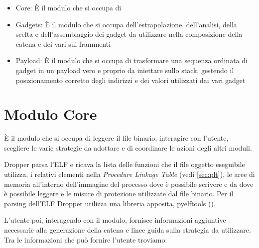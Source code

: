 \begin{itemize}

  \item Core: È il modulo che si occupa di 
  \item Gadgets: È il modulo che si occupa dell'estrapolazione,
    dell'analisi, della scelta e dell'assemblaggio dei gadget da utilizzare nella
    composizione della catena e dei vari sui frammenti

  \item Payload: È il modulo che si occupa di trasformare una
    sequenza ordinata di gadget in un payload vero e proprio da
    iniettare sullo stack, gestendo il posizionamento corretto degli
    indirizzi e dei valori utilizzati dai vari gadget

\end{itemize}

\section{Modulo Core}
\label{sec:arc:core}

È il modulo che si occupa di leggere il file binario, interagire con
l'utente, scegliere le varie strategie da adottare e di coordinare le
azioni degli altri moduli. 

Dropper parsa l'ELF e ricava la lista delle funzioni che il file
oggetto eseguibile utilizza, i relativi elementi nella \emph{Procedure
  Linkage Table} (vedi \ref{sec:plt}), le aree di memoria all'interno
dell'immagine del processo dove è possibile scrivere e da dove è
possibile leggere e le misure di protezione utilizzate dal file
binario. Per il parsing dell'ELF Dropper utilizza una libreria
apposita, pyelftools (\cite{pyelftools}).

L'utente poi, interagendo con il modulo, fornisce informazioni
aggiuntive necessarie alla generazione della catena e linee guida
sulla strategia da utilizzare. Tra le informazioni che può fornire
l'utente troviamo:

